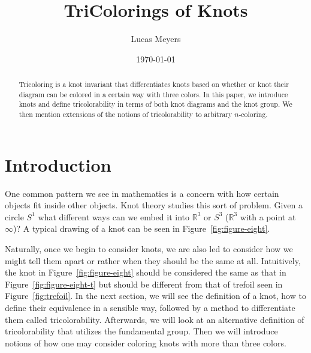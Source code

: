 \documentclass[12pt]{amsart}
\theoremstyle{definition}
\theoremstyle{remark}
\numberwithin{equation}{section}
\newcommand{\bb}[1]{\mathbb{#1}}
\begin{document}
\title{TriColorings of Knots}


\author{Lucas Meyers}
\address{Mathematics Department\\
Louisiana State University\\
Baton Rouge, Louisiana}

\date{\today}

\begin{abstract}
  Tricoloring is a knot invariant that differentiates knots
  based on whether or knot their diagram can be colored in a
  certain way with three colors. In this paper, we introduce knots
  and define tricolorability in terms of both knot diagrams
  and the knot group. We then mention extensions of the notions
  of tricolorability to arbitrary $n$-coloring.
\end{abstract}

\maketitle

\section{Introduction}
\label{introduction}

One common pattern we see in mathematics is a concern with how
certain objects fit inside other objects. Knot theory studies this
sort of problem. Given a circle $S^1$ what different ways can we embed
it into $\bb{R}^3$ or $S^3$ ($\bb{R}^3$ with a point at $\infty$)?
A typical drawing of a knot can be seen in Figure~\ref{fig:figure-eight}.



Naturally, once we begin to consider knots, we are also led to consider
how we might tell them apart or rather when they should be the same
at all. Intuitively, the knot in Figure~\ref{fig:figure-eight} should
be considered the same as that in Figure~\ref{fig:figure-eight-t} but should be
different from that of trefoil seen in Figure~\ref{fig:trefoil}. In
the next section, we will see the definition of a knot, how to define their
equivalence in a sensible way, followed by a method to differentiate them
called tricolorability. Afterwards, we will look at an alternative definition
of tricolorability that utilizes the fundamental group.
Then we will introduce notions of how one may consider
coloring knots with more than three colors.
\end{document}
